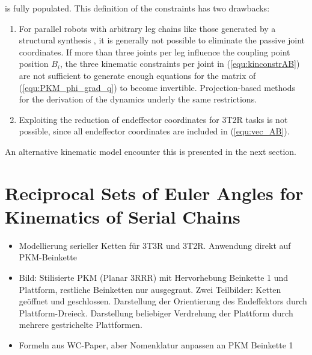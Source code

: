 \documentclass[robotics,article,submit,moreauthors,pdftex]{Definitions/mdpi}
\newcommand{\bm}[1]{\boldsymbol{#1}}
\begin{document}
%
is fully populated.
This definition of the constraints has two drawbacks:
\begin{enumerate}
    \item For parallel robots with arbitrary leg chains like those generated by a structural synthesis \cite{Gogu2008,RamirezKotOrt2015}, it is generally not possible to eliminate the passive joint coordinates. If more than three joints per leg influence the coupling point position $B_i$, the three kinematic constraints per joint in (\ref{equ:kinconstrAB}) are not sufficient to generate enough equations for the matrix of (\ref{equ:PKM_phi_grad_q}) to become invertible. Projection-based methods for the derivation of the dynamics \cite{Merlet2006,BriotKha2015,AbdellatifHei2009,DoThanhKotHeiOrt2009b} underly the same restrictions.
    \item Exploiting the reduction of endeffector coordinates for 3T2R tasks is not possible, since all endeffector coordinates are included in (\ref{equ:vec_AB}).
\end{enumerate}

An alternative kinematic model encounter this is presented in the next section.

%


\section{Reciprocal Sets of Euler Angles for Kinematics of Serial Chains}
\label{sec:REW_seriell}

\cite{1_SchapplerTapOrt2019}

\begin{itemize}
    \item Modellierung serieller Ketten für 3T3R und 3T2R. Anwendung direkt auf PKM-Beinkette
    \item Bild: Stilisierte PKM (Planar 3RRR) mit Hervorhebung Beinkette 1 und Plattform, restliche Beinketten nur ausgegraut. Zwei Teilbilder: Ketten geöffnet und geschlossen. Darstellung der Orientierung des Endeffektors durch Plattform-Dreieck. Darstellung beliebiger Verdrehung der Plattform durch mehrere gestrichelte Plattformen.
    \item Formeln aus WC-Paper, aber Nomenklatur anpassen an PKM Beinkette 1
\end{itemize}
\end{document}
